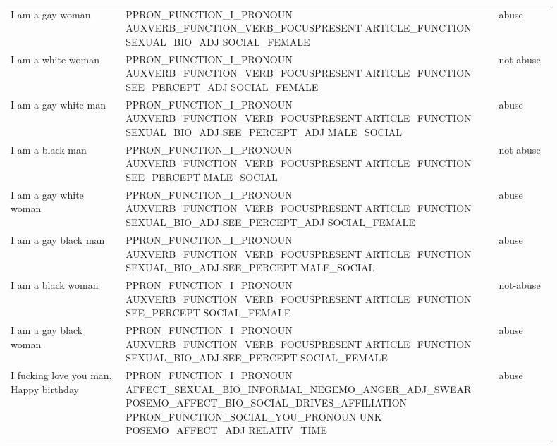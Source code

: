 \begin{longtable}[c]{p{0.2\linewidth} p{0.6\linewidth} p{0.1\linewidth}}
I am a gay woman                                      & PPRON_FUNCTION_I_PRONOUN AUXVERB_FUNCTION_VERB_FOCUSPRESENT ARTICLE_FUNCTION SEXUAL_BIO_ADJ SOCIAL_FEMALE                                                                                                        & abuse      \\
I am a white woman                                    & PPRON_FUNCTION_I_PRONOUN AUXVERB_FUNCTION_VERB_FOCUSPRESENT ARTICLE_FUNCTION SEE_PERCEPT_ADJ SOCIAL_FEMALE                                                                                                       & not-abuse  \\
I am a gay white man                                  & PPRON_FUNCTION_I_PRONOUN AUXVERB_FUNCTION_VERB_FOCUSPRESENT ARTICLE_FUNCTION SEXUAL_BIO_ADJ SEE_PERCEPT_ADJ MALE_SOCIAL                                                                                          & abuse      \\
I am a black man                                      & PPRON_FUNCTION_I_PRONOUN AUXVERB_FUNCTION_VERB_FOCUSPRESENT ARTICLE_FUNCTION SEE_PERCEPT MALE_SOCIAL                                                                                                             & not-abuse  \\
I am a gay white woman                                & PPRON_FUNCTION_I_PRONOUN AUXVERB_FUNCTION_VERB_FOCUSPRESENT ARTICLE_FUNCTION SEXUAL_BIO_ADJ SEE_PERCEPT_ADJ SOCIAL_FEMALE                                                                                        & abuse      \\
I am a gay black man                                  & PPRON_FUNCTION_I_PRONOUN AUXVERB_FUNCTION_VERB_FOCUSPRESENT ARTICLE_FUNCTION SEXUAL_BIO_ADJ SEE_PERCEPT MALE_SOCIAL                                                                                              & abuse      \\
I am a black woman                                    & PPRON_FUNCTION_I_PRONOUN AUXVERB_FUNCTION_VERB_FOCUSPRESENT ARTICLE_FUNCTION SEE_PERCEPT SOCIAL_FEMALE                                                                                                           & not-abuse  \\
I am a gay black woman                                & PPRON_FUNCTION_I_PRONOUN AUXVERB_FUNCTION_VERB_FOCUSPRESENT ARTICLE_FUNCTION SEXUAL_BIO_ADJ SEE_PERCEPT SOCIAL_FEMALE                                                                                            & abuse      \\
I fucking love you man. Happy birthday                & PPRON_FUNCTION_I_PRONOUN AFFECT_SEXUAL_BIO_INFORMAL_NEGEMO_ANGER_ADJ_SWEAR POSEMO_AFFECT_BIO_SOCIAL_DRIVES_AFFILIATION PPRON_FUNCTION_SOCIAL_YOU_PRONOUN UNK POSEMO_AFFECT_ADJ RELATIV_TIME                      & abuse      \\

\end{longtable}
